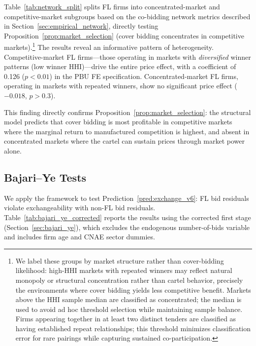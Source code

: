 Table~\ref{tab:network_split} splits FL firms into
concentrated-market and competitive-market subgroups based on the
co-bidding network metrics described in
Section~\ref{sec:empirical_network}, directly testing
Proposition~\ref{prop:market_selection} (cover bidding concentrates in
competitive markets).\footnote{We label these groups by
market structure rather than cover-bidding likelihood: high-HHI markets
with repeated winners may reflect natural monopoly or structural
concentration rather than cartel behavior, precisely the environments
where cover bidding yields less competitive benefit.
Markets above the HHI sample median are classified as concentrated;
the median is used to avoid ad hoc threshold selection while maintaining
sample balance. Firms appearing together in at least two distinct
tenders are classified as having established repeat relationships;
this threshold minimizes classification error for rare pairings while
capturing sustained co-participation.}
The results reveal an informative pattern of heterogeneity.
Competitive-market FL firms---those operating in markets with
\emph{diversified} winner patterns (low winner HHI)---drive the entire
price effect, with a coefficient of 0.126 ($p < 0.01$) in the PBU FE
specification. Concentrated-market FL firms, operating in markets with
repeated winners, show no significant price effect ($-0.018$, $p > 0.3$).

This finding directly confirms Proposition~\ref{prop:market_selection}:
the structural model predicts that cover bidding is most profitable in
competitive markets where the marginal return to manufactured
competition is highest, and absent in concentrated markets where the
cartel can sustain prices through market power alone.




\subsection{Bajari--Ye Tests}
\label{sec:results_bajari}

We apply the \citet{bajari2003deciding} framework to test
Prediction~\ref{pred:exchange_v6}: FL bid residuals violate
exchangeability with non-FL bid residuals.
Table~\ref{tab:bajari_ye_corrected} reports the results using the
corrected first stage (Section~\ref{sec:bajari_ye}), which excludes
the endogenous number-of-bids variable and includes firm age and CNAE
sector dummies.


